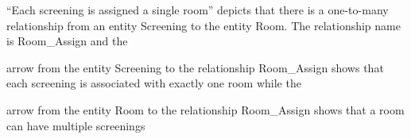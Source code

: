\documentclass{article}
\begin{document}
``Each screening is assigned a single room'' depicts that there is a one-to-many
relationship from an entity Screening to the entity Room. The relationship name
is Room\_Assign and the
arrow from the entity Screening to the relationship Room\_Assign shows that each
screening is associated with exactly one room while the
arrow from the entity Room to the relationship Room\_Assign shows that a room
can have multiple screenings
 
\end{document}
